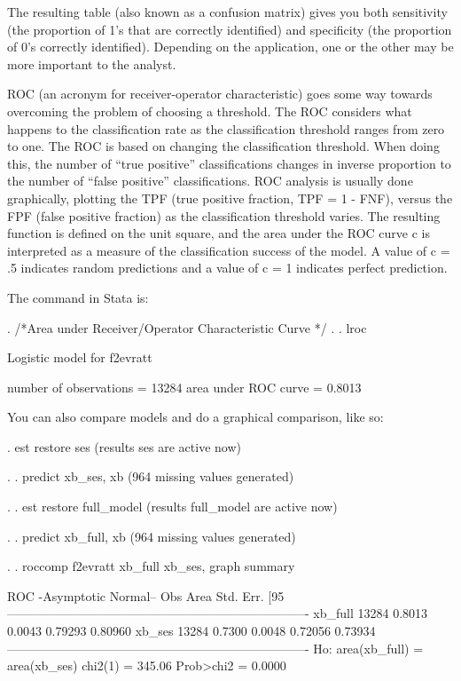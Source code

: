 \documentclass[12pt]{article}
\begin{document}
The resulting table (also known as a confusion matrix) gives you both
sensitivity (the proportion of 1's that are correctly identified) and
specificity (the proportion of 0's correctly identified). Depending on
the application, one or the other may be more important to the
analyst.


ROC (an acronym for receiver-operator characteristic) goes some way
towards overcoming the problem of choosing a threshold. The ROC
considers what happens to the classification rate as the
classification threshold ranges from zero to one.  The ROC is based on
changing the classification threshold. When doing this, the number of
``true positive'' classifications changes in inverse proportion to the
number of ``false positive'' classifications. ROC analysis is usually
done graphically, plotting the TPF (true positive fraction, TPF = 1 -
FNF), versus the FPF (false positive fraction) as the classification
threshold varies. The resulting function is defined on the unit
square, and the area under the ROC curve c is interpreted as a measure
of the classification success of the model. A value of c = .5
indicates random predictions and a value of c = 1 indicates perfect
prediction.

The command in Stata is:

\begin{stlog}

. /*Area under Receiver/Operator Characteristic Curve */
. 
. lroc 

Logistic model for f2evratt

number of observations =    13284
area under ROC curve   =   0.8013

\end{stlog}

You can also compare models and do a graphical comparison, like so: 

\begin{stlog}

.   est restore ses
(results ses are active now)

. 
. predict xb_ses, xb
(964 missing values generated)

. 
. est restore full_model
(results full_model are active now)

. 
. predict xb_full, xb
(964 missing values generated)

.  
. roccomp f2evratt xb_full xb_ses, graph summary

                              ROC                    -Asymptotic Normal--
                   Obs       Area     Std. Err.      [95%
-------------------------------------------------------------------------
xb_full          13284     0.8013       0.0043        0.79293     0.80960
xb_ses           13284     0.7300       0.0048        0.72056     0.73934
-------------------------------------------------------------------------
Ho: area(xb_full) = area(xb_ses)
    chi2(1) =   345.06       Prob>chi2 =   0.0000

\end{stlog}
\end{document}
